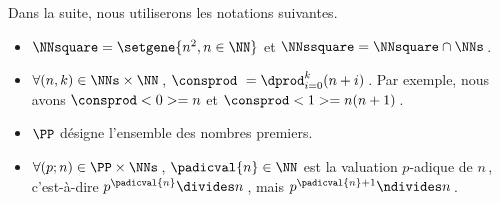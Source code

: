 Dans la suite, nous utiliserons les notations suivantes.
\begin{itemize}
	\item $\NNsquare = \setgene{n^2, n \in \NN}$
	      et
	      $\NNssquare = \NNsquare \cap \NNs$\,.

	\item $\forall (n, k) \in \NNs \times \NN$\,, $\consprod\ = \dprod_{i = 0}^{k} (n + i)$\,. 
	Par exemple, nous avons $\consprod<0> = n$ et $\consprod<1> = n(n+1)$\,.

	\item $\PP$ désigne l'ensemble des nombres premiers.
	
	\item $\forall (p ; n) \in \PP \times \NNs$\,, $\padicval{n} \in \NN$ est la valuation $p$-adique de $n$\,, c'est-à-dire $p^{\padicval{n}} \divides n$\,, mais $p^{\padicval{n} + 1} \ndivides n$\,.
\end{itemize}
